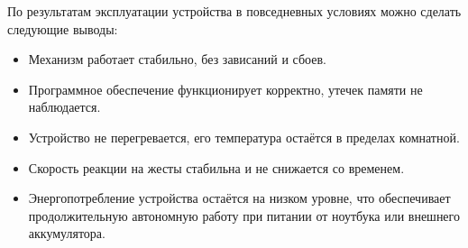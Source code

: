 \documentclass[a4paper, 12pt]{article} %
\begin{document}
По результатам эксплуатации устройства в повседневных условиях можно сделать следующие выводы:
\begin{itemize}
    \item Механизм работает стабильно, без зависаний и сбоев.
    \item Программное обеспечение функционирует корректно, утечек памяти не наблюдается.
    \item Устройство не перегревается, его температура остаётся в пределах комнатной.
    \item Скорость реакции на жесты стабильна и не снижается со временем.
    \item Энергопотребление устройства остаётся на низком уровне, что обеспечивает продолжительную автономную работу при питании от ноутбука или внешнего аккумулятора.
\end{itemize}
\end{document}
